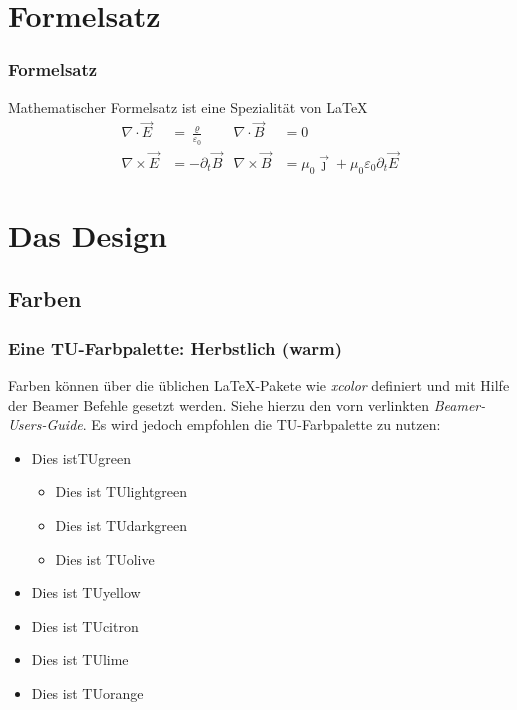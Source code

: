 \documentclass[9pt]{beamer}
\begin{document}
\section{Formelsatz}
\begin{frame}
	\frametitle{Formelsatz}
	\begin{block}{Mathematischer Formelsatz ist eine Spezialität von \LaTeX}
    \begin{align*}
      \nabla \cdot \vec{E} &= \frac{\varrho}{\varepsilon_0} &
      \nabla \cdot \vec{B} &= 0 \\
      \nabla \times \vec{E} &= -\partial_t \vec{B} &
      \nabla \times \vec{B} &= \mu_0 \vec{\jmath} + \mu_0\varepsilon_0 \partial_t \vec{E}
    \end{align*}
	\end{block}
\end{frame}

\section{Das Design}
\subsection{Farben}
\begin{frame}
    \frametitle{Eine TU-Farbpalette: Herbstlich (warm)}
    Farben können über die üblichen \LaTeX-Pakete wie \emph{xcolor} definiert und mit Hilfe der Beamer Befehle gesetzt werden.
    Siehe hierzu den vorn verlinkten \emph{Beamer-Users-Guide}. Es wird jedoch empfohlen die TU-Farbpalette zu nutzen:
    \begin{itemize}
        \item \textcolor{TUgreen}{Dies istTUgreen}
            \begin{itemize}
                \item \textcolor{TUlightgreen}{Dies ist TUlightgreen}
                \item \textcolor{TUdarkgreen}{Dies ist TUdarkgreen}
                \item \textcolor{TUolive}{Dies ist TUolive}
            \end{itemize}
        \item \textcolor{TUyellow}{Dies ist TUyellow}
        \item \textcolor{TUcitron}{Dies ist TUcitron}
        \item \textcolor{TUlime}{Dies ist TUlime}
        \item \textcolor{TUorange}{Dies ist TUorange}
    \end{itemize}
\end{frame}
\end{document}
